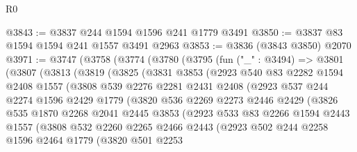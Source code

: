 \begin{lexlean}{R0}
\begin{coremodule}
@3843 := @3837 @244 @1594 @1596 @241 @1779 @3491
@3850 := @3837 @83 @1594 @1594 @241 @1557 @3491 @2963
@3853 := @3836 (@3843 @3850) @2070
@3971 := @3747
    (@3758
      (@3774
        (@3780
          (@3795
            (fun ("_" : @3494) =>
            @3801
              (@3807
                (@3813
                  (@3819
                    (@3825
                      (@3831
                        @3853
                        (@2923
                          @540
                          @83
                          @2282
                          @1594
                          @2408
                          @1557
                          (@3808
                            @539
                            @2276
                            @2281
                            @2431
                            @2408
                            (@2923
                              @537
                              @244
                              @2274
                              @1596
                              @2429
                              @1779
                              (@3820
                                @536
                                @2269
                                @2273
                                @2446
                                @2429
                                (@3826
                                  @535
                                  @1870
                                  @2268
                                  @2041
                                  @2445
                                  @3853
                                  (@2923
                                    @533
                                    @83
                                    @2266
                                    @1594
                                    @2443
                                    @1557
                                    (@3808
                                      @532
                                      @2260
                                      @2265
                                      @2466
                                      @2443
                                      (@2923
                                        @502
                                        @244
                                        @2258
                                        @1596
                                        @2464
                                        @1779
                                        (@3820
                                          @501
                                          @2253

\end{coremodule}
\end{lexlean}
